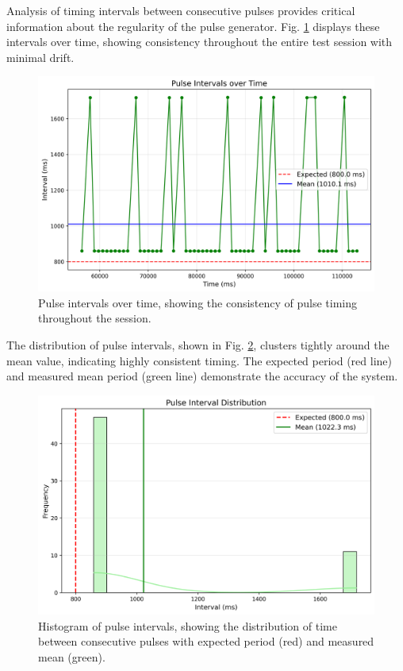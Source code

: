 \documentclass[conference]{IEEEtran}
\begin{document}
Analysis of timing intervals between consecutive pulses provides critical information about the regularity of the pulse generator. Fig. \ref{fig:pulse_intervals} displays these intervals over time, showing consistency throughout the entire test session with minimal drift.

\begin{figure}[htbp]
    \centering
    \includegraphics[width=\linewidth]{data/pulse_session_2025-05-09_1442/plots/pulse_intervals.png}
    \caption{Pulse intervals over time, showing the consistency of pulse timing throughout the session.}
    \label{fig:pulse_intervals}
\end{figure}

The distribution of pulse intervals, shown in Fig. \ref{fig:pulse_interval_hist}, clusters tightly around the mean value, indicating highly consistent timing. The expected period (red line) and measured mean period (green line) demonstrate the accuracy of the system.

\begin{figure}[htbp]
    \centering
    \includegraphics[width=\linewidth]{data/pulse_session_2025-05-09_1442/plots/pulse_interval_hist.png}
    \caption{Histogram of pulse intervals, showing the distribution of time between consecutive pulses with expected period (red) and measured mean (green).}
    \label{fig:pulse_interval_hist}
\end{figure}
\end{document}
